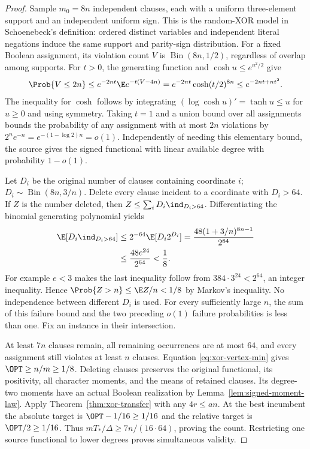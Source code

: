 \begin{proof}
Sample $m_0=8n$ independent clauses, each with a uniform three-element
support and an independent uniform sign. This is the random-XOR model in
Schoenebeck's definition: ordered distinct variables and independent literal
negations induce the same support and parity-sign distribution.
For a fixed Boolean assignment, its violation count $V$ is
$\operatorname{Bin}(8n,1/2)$, regardless of overlap among supports. For
$t>0$, the generating function and $\cosh u\le e^{u^2/2}$ give
\[
 \Prob\{V\le2n\}
 \le e^{-2nt}\E e^{-t(V-4n)}
 =e^{-2nt}\cosh(t/2)^{8n}
 \le e^{-2nt+nt^2}.
\]
The inequality for $\cosh$ follows by integrating
$(\log\cosh u)'=\tanh u\le u$ for $u\ge0$ and using symmetry.
Taking $t=1$ and a union bound over all assignments bounds the probability
of any assignment with at most $2n$ violations by
$2^ne^{-n}=e^{-(1-\log2)n}=o(1)$. Independently of needing this elementary
bound, the source gives the signed functional with linear available degree
with probability $1-o(1)$.

Let $D_i$ be the original number of clauses containing coordinate $i$;
$D_i\sim\operatorname{Bin}(8n,3/n)$. Delete every clause incident to a
coordinate with $D_i>64$. If $Z$ is the number deleted, then
$Z\le\sum_iD_i\ind_{D_i>64}$. Differentiating the binomial generating
polynomial yields
\begin{align}
 \E[D_i\ind_{D_i>64}]
 &\le2^{-64}\E[D_i2^{D_i}]
   =\frac{48(1+3/n)^{8n-1}}{2^{64}}\nonumber\\
 &\le\frac{48e^{24}}{2^{64}}<\frac18.
 \label{eq:xor-deletion}
\end{align}
For example $e<3$ makes the last inequality follow from
$384\cdot3^{24}<2^{64}$, an integer inequality. Hence
$\Prob\{Z>n\}\le\E Z/n<1/8$ by Markov's inequality.
No independence between different $D_i$ is used. For every sufficiently
large $n$, the sum of this failure bound and the two preceding $o(1)$
failure probabilities is less than one. Fix an instance in their
intersection.

At least $7n$ clauses remain, all remaining occurrences are at most $64$,
and every assignment still violates at least $n$ clauses. Equation
\eqref{eq:xor-vertex-min} gives $\OPT\ge n/m\ge1/8$.
Deleting clauses preserves the original functional, its positivity, all
character moments, and the means of retained clauses. Its degree-two
moments have an actual Boolean realization by
Lemma~\ref{lem:signed-moment-law}. Apply Theorem~\ref{thm:xor-transfer}
with any $4r\le an$. At the best incumbent the absolute target is
$\OPT-1/16\ge1/16$ and the relative target is $\OPT/2\ge1/16$.
Thus $mT_*/\Delta\ge7n/(16\cdot64)$, proving the count. Restricting
one source functional to lower degrees proves simultaneous validity.
\end{proof}

